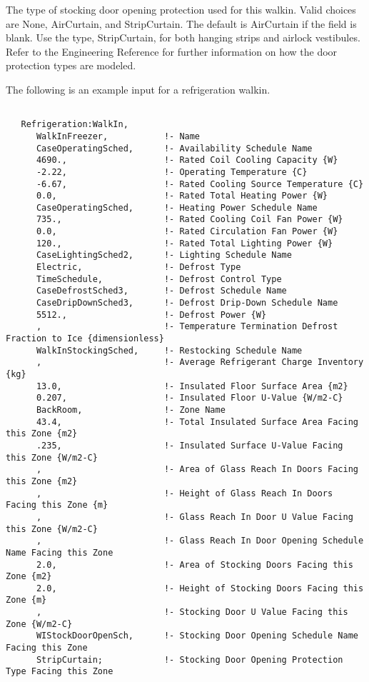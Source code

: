 The type of stocking door opening protection used for this walkin. Valid choices are None, AirCurtain, and StripCurtain. The default is AirCurtain if the field is blank. Use the type, StripCurtain, for both hanging strips and airlock vestibules. Refer to the Engineering Reference for further information on how the door protection types are modeled.

The following is an example input for a refrigeration walkin.

\begin{lstlisting}

   Refrigeration:WalkIn,
      WalkInFreezer,           !- Name
      CaseOperatingSched,      !- Availability Schedule Name
      4690.,                   !- Rated Coil Cooling Capacity {W}
      -2.22,                   !- Operating Temperature {C}
      -6.67,                   !- Rated Cooling Source Temperature {C}
      0.0,                     !- Rated Total Heating Power {W}
      CaseOperatingSched,      !- Heating Power Schedule Name
      735.,                    !- Rated Cooling Coil Fan Power {W}
      0.0,                     !- Rated Circulation Fan Power {W}
      120.,                    !- Rated Total Lighting Power {W}
      CaseLightingSched2,      !- Lighting Schedule Name
      Electric,                !- Defrost Type
      TimeSchedule,            !- Defrost Control Type
      CaseDefrostSched3,       !- Defrost Schedule Name
      CaseDripDownSched3,      !- Defrost Drip-Down Schedule Name
      5512.,                   !- Defrost Power {W}
      ,                        !- Temperature Termination Defrost Fraction to Ice {dimensionless}
      WalkInStockingSched,     !- Restocking Schedule Name
      ,                        !- Average Refrigerant Charge Inventory {kg}
      13.0,                    !- Insulated Floor Surface Area {m2}
      0.207,                   !- Insulated Floor U-Value {W/m2-C}
      BackRoom,                !- Zone Name
      43.4,                    !- Total Insulated Surface Area Facing this Zone {m2}
      .235,                    !- Insulated Surface U-Value Facing this Zone {W/m2-C}
      ,                        !- Area of Glass Reach In Doors Facing this Zone {m2}
      ,                        !- Height of Glass Reach In Doors Facing this Zone {m}
      ,                        !- Glass Reach In Door U Value Facing this Zone {W/m2-C}
      ,                        !- Glass Reach In Door Opening Schedule Name Facing this Zone
      2.0,                     !- Area of Stocking Doors Facing this Zone {m2}
      2.0,                     !- Height of Stocking Doors Facing this Zone {m}
      ,                        !- Stocking Door U Value Facing this Zone {W/m2-C}
      WIStockDoorOpenSch,      !- Stocking Door Opening Schedule Name Facing this Zone
      StripCurtain;            !- Stocking Door Opening Protection Type Facing this Zone
\end{lstlisting}

